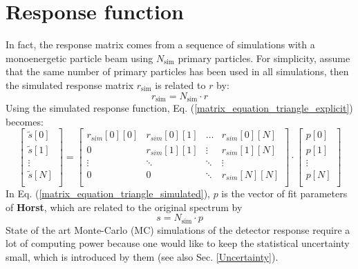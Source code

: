 \documentclass{article}
\begin{document}
\section{Response function}
In fact, the response matrix comes from a sequence of simulations with a monoenergetic particle beam using $N_\mathrm{sim}$ primary particles. For simplicity, assume that the same number of primary particles has been used in all simulations, then the simulated response matrix $r_\mathrm{sim}$ is related to $r$ by:
%
\begin{equation}
	r_\mathrm{sim} = N_\mathrm{sim} \cdot r
\end{equation}
%
Using the simulated response function, Eq. (\ref{matrix_equation_triangle_explicit}) becomes:
%
\begin{equation}
	\label{matrix_equation_triangle_simulated}
	\left[ 
		\begin{array}{c}
			\tilde{s}[0] \\
			\tilde{s}[1] \\
			\vdots	\\
			\tilde{s}[N] \\
		\end{array}
	\right]
	= 
	\begin{bmatrix}
		r_{sim}[0][0] & r_{sim}[0][1] & \hdots & r_{sim}[0][N] \\
		0       & r_{sim}[1][1] & \vdots & r_{sim}[1][N] \\
		\vdots  & \ddots  & \ddots & \vdots  \\
		0       & 0       & \ddots & r_{sim}[N][N] \\
	\end{bmatrix}
	\cdot
	\left[ 
		\begin{array}{c}
			p[0] \\
			p[1] \\
			\vdots	\\
			p[N] \\
		\end{array}
	\right]
\end{equation}
%
In Eq. (\ref{matrix_equation_triangle_simulated}), $p$ is the vector of fit parameters of \textbf{Horst}, which are related to the original spectrum by
%
\begin{equation}
	s = N_\mathrm{sim} \cdot p
\end{equation}
%
State of the art Monte-Carlo (MC) simulations of the detector response require a lot of computing power because one would like to keep the statistical uncertainty small, which is introduced by them (see also Sec. \ref{Uncertainty}).
\end{document}
